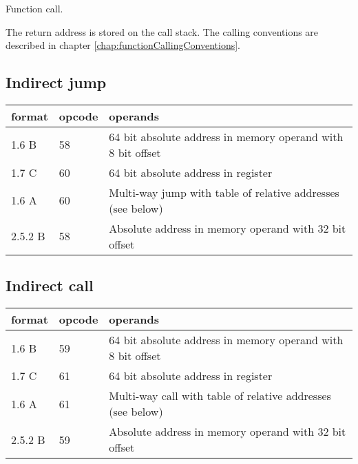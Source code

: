 \documentclass[forwardcom.tex]{subfiles}
\begin{document}
Function call.
\vv

The return address is stored on the call stack. The calling conventions are described in chapter \ref{chap:functionCallingConventions}.


\subsection{Indirect jump}

\label{table:indirectJumpInstruction}
\begin{tabular}{|p{14mm}|p{12mm}|p{110mm}|}
\hline
\bfseries format & \bfseries opcode & \bfseries operands \\ \hline
1.6 B & 58 & 64 bit absolute address in memory operand with 8 bit offset \\ \hline
1.7 C & 60 & 64 bit absolute address in register \\ \hline
1.6 A & 60 & Multi-way jump with table of relative addresses (see below) \\ \hline
2.5.2 B & 58 & Absolute address in memory operand with 32 bit offset \\ \hline
\end{tabular}
\vv


\subsection{Indirect call}
\label{table:IndirectCallInstruction}
\begin{tabular}{|p{14mm}|p{12mm}|p{110mm}|}
\hline
\bfseries format & \bfseries opcode & \bfseries operands \\ \hline
1.6 B & 59 & 64 bit absolute address in memory operand with 8 bit offset \\ \hline
1.7 C & 61 & 64 bit absolute address in register \\ \hline
1.6 A & 61 & Multi-way call with table of relative addresses (see below) \\ \hline
2.5.2 B & 59 & Absolute address in memory operand with 32 bit offset \\ \hline
\end{tabular}
\vv
\end{document}
